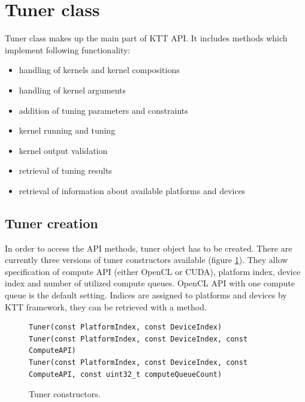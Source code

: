 \documentclass
[
    digital, %
    oneside, %
    table, %
    nolof, %
    nolot, %
    nocover %
]{fithesis3}
\begin{document}
\section{Tuner class}
Tuner class makes up the main part of KTT API. It includes methods which implement following functionality:
\begin{itemize}
    \item handling of kernels and kernel compositions
    \item handling of kernel arguments
    \item addition of tuning parameters and constraints
    \item kernel running and tuning
    \item kernel output validation
    \item retrieval of tuning results
    \item retrieval of information about available platforms and devices
\end{itemize}

\subsection{Tuner creation}
In order to access the API methods, tuner object has to be created. There are currently three versions of tuner constructors available (figure 
\ref{ktt-constructors}). They allow specification of compute API (either OpenCL or CUDA), platform index, device index and number of utilized compute
queues. OpenCL API with one compute queue is the default setting. Indices are assigned to platforms and devices by KTT framework, they can be retrieved
with a method.

\begin{figure}
\begin{lstlisting}
Tuner(const PlatformIndex, const DeviceIndex)
Tuner(const PlatformIndex, const DeviceIndex, const ComputeAPI)
Tuner(const PlatformIndex, const DeviceIndex, const ComputeAPI, const uint32_t computeQueueCount)
\end{lstlisting}
\caption{Tuner constructors.}
\label{ktt-constructors}
\end{figure}
\end{document}
